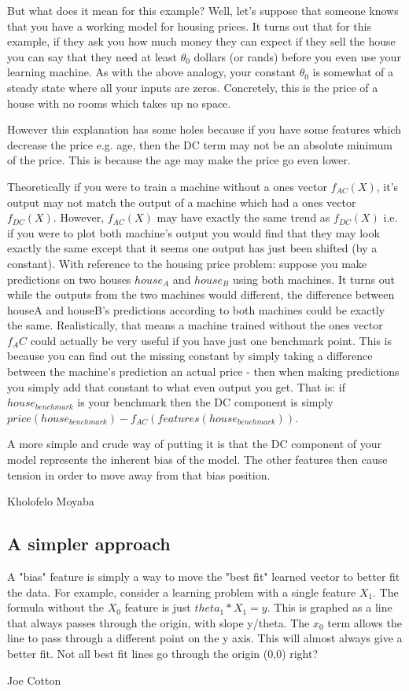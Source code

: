 But what does it mean for this example? Well, let's suppose that someone knows that you have a working model for housing prices. It turns out that for this example, if they ask you how much money they can expect if they sell the house you can say that they need at least $\theta_0$ dollars (or rands) before you even use your learning machine. As with the above analogy, your constant $\theta_0$ is somewhat of a steady state where all your inputs are zeros. Concretely, this is the price of a house with no rooms which takes up no space.

However this explanation has some holes because if you have some features which decrease the price e.g. age, then the DC term may not be an absolute minimum of the price. This is because the age may make the price go even lower.

Theoretically if you were to train a machine without a ones vector $f_{AC}(X)$, it's output may not  match the output of a machine which had a ones vector $f_{DC}(X)$. However, $f_{AC}(X)$ may have exactly the same trend as $f_{DC}(X)$ i.e. if you were to plot both machine's output you would find that they may look exactly the same except that it seems one output has just been shifted (by a constant). With reference to the housing price problem: suppose you make predictions on two houses $house_A$ and $house_B$ using both machines. It turns out while the outputs from the two machines would different, the difference between houseA and houseB's predictions according to both machines could be exactly the same. Realistically, that means a machine trained without the ones vector $f_AC$ could actually be very useful if you have just one benchmark point. This is because you can find out the missing constant by simply taking a difference between the machine's prediction an actual price - then when making predictions you simply add that constant to what even output you get. That is: if $house_{benchmark}$ is your benchmark then the DC component is simply $price(house_{benchmark}) - f_{AC}(features(house_{benchmark}))$.

A more simple and crude way of putting it is that the DC component of your model represents the inherent bias of the model. The other features then cause tension in order to move away from that bias position.

Kholofelo Moyaba

\subsection{A simpler approach}

A "bias" feature is simply a way to move the "best fit" learned vector to better fit the data. For example, consider a learning problem with a single feature $X_1$. The formula without the $X_0$ feature is just $theta_1 \ast X_1 = y$. This is graphed as a line that always passes through the origin, with slope y/theta. The $x_0$ term allows the line to pass through a different point on the y axis. This will almost always give a better fit. Not all best fit lines go through the origin (0,0) right?

Joe Cotton